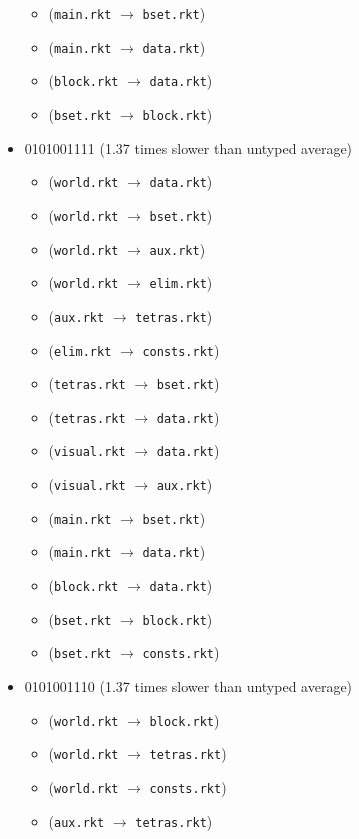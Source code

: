 \documentclass{article}
\newcommand{\mono}[1]{\texttt{#1}}
\begin{document}
\begin{itemize}
\begin{itemize}
  \item (\mono{main.rkt} $\rightarrow$ \mono{bset.rkt})
  \item (\mono{main.rkt} $\rightarrow$ \mono{data.rkt})
  \item (\mono{block.rkt} $\rightarrow$ \mono{data.rkt})
  \item (\mono{bset.rkt} $\rightarrow$ \mono{block.rkt})
  \end{itemize}
\item 0101001111 (1.37 times slower than untyped average)
  \begin{itemize}
  \item (\mono{world.rkt} $\rightarrow$ \mono{data.rkt})
  \item (\mono{world.rkt} $\rightarrow$ \mono{bset.rkt})
  \item (\mono{world.rkt} $\rightarrow$ \mono{aux.rkt})
  \item (\mono{world.rkt} $\rightarrow$ \mono{elim.rkt})
  \item (\mono{aux.rkt} $\rightarrow$ \mono{tetras.rkt})
  \item (\mono{elim.rkt} $\rightarrow$ \mono{consts.rkt})
  \item (\mono{tetras.rkt} $\rightarrow$ \mono{bset.rkt})
  \item (\mono{tetras.rkt} $\rightarrow$ \mono{data.rkt})
  \item (\mono{visual.rkt} $\rightarrow$ \mono{data.rkt})
  \item (\mono{visual.rkt} $\rightarrow$ \mono{aux.rkt})
  \item (\mono{main.rkt} $\rightarrow$ \mono{bset.rkt})
  \item (\mono{main.rkt} $\rightarrow$ \mono{data.rkt})
  \item (\mono{block.rkt} $\rightarrow$ \mono{data.rkt})
  \item (\mono{bset.rkt} $\rightarrow$ \mono{block.rkt})
  \item (\mono{bset.rkt} $\rightarrow$ \mono{consts.rkt})
  \end{itemize}
\item 0101001110 (1.37 times slower than untyped average)
  \begin{itemize}
  \item (\mono{world.rkt} $\rightarrow$ \mono{block.rkt})
  \item (\mono{world.rkt} $\rightarrow$ \mono{tetras.rkt})
  \item (\mono{world.rkt} $\rightarrow$ \mono{consts.rkt})
  \item (\mono{aux.rkt} $\rightarrow$ \mono{tetras.rkt})

\end{itemize}
\end{itemize}
\end{document}
